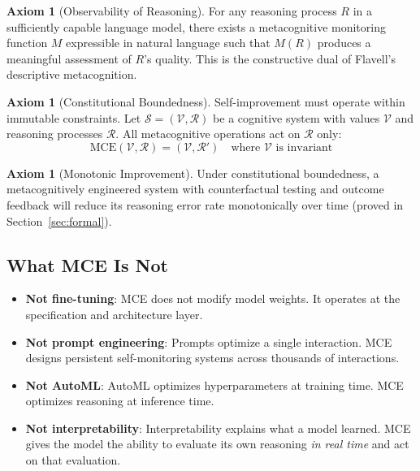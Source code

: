 \documentclass[12pt,a4paper]{article}
\theoremstyle{plain}
\theoremstyle{definition}
\newtheorem{axiom}[theorem]{Axiom}
\theoremstyle{remark}
\begin{document}
\begin{axiom}[Observability of Reasoning]
\label{ax:observability}
For any reasoning process $R$ in a sufficiently capable language model, there exists a metacognitive monitoring function $M$ expressible in natural language such that $M(R)$ produces a meaningful assessment of $R$'s quality. This is the constructive dual of Flavell's descriptive metacognition.
\end{axiom}

\begin{axiom}[Constitutional Boundedness]
\label{ax:bounded}
Self-improvement must operate within immutable constraints. Let $\mathcal{S} = (\mathcal{V}, \mathcal{R})$ be a cognitive system with values $\mathcal{V}$ and reasoning processes $\mathcal{R}$. All metacognitive operations act on $\mathcal{R}$ only:
\[
\text{MCE}(\mathcal{V}, \mathcal{R}) = (\mathcal{V}, \mathcal{R}') \quad \text{where } \mathcal{V} \text{ is invariant}
\]
\end{axiom}

\begin{axiom}[Monotonic Improvement]
\label{ax:monotonic}
Under constitutional boundedness, a metacognitively engineered system with counterfactual testing and outcome feedback will reduce its reasoning error rate monotonically over time (proved in Section~\ref{sec:formal}).
\end{axiom}

\subsection{What MCE Is Not}

\begin{itemize}[nosep]
\item \textbf{Not fine-tuning}: MCE does not modify model weights. It operates at the specification and architecture layer.
\item \textbf{Not prompt engineering}: Prompts optimize a single interaction. MCE designs persistent self-monitoring systems across thousands of interactions.
\item \textbf{Not AutoML}: AutoML optimizes hyperparameters at training time. MCE optimizes reasoning at inference time.
\item \textbf{Not interpretability}: Interpretability explains what a model learned. MCE gives the model the ability to evaluate its own reasoning \emph{in real time} and act on that evaluation.
\end{itemize}
\end{document}
